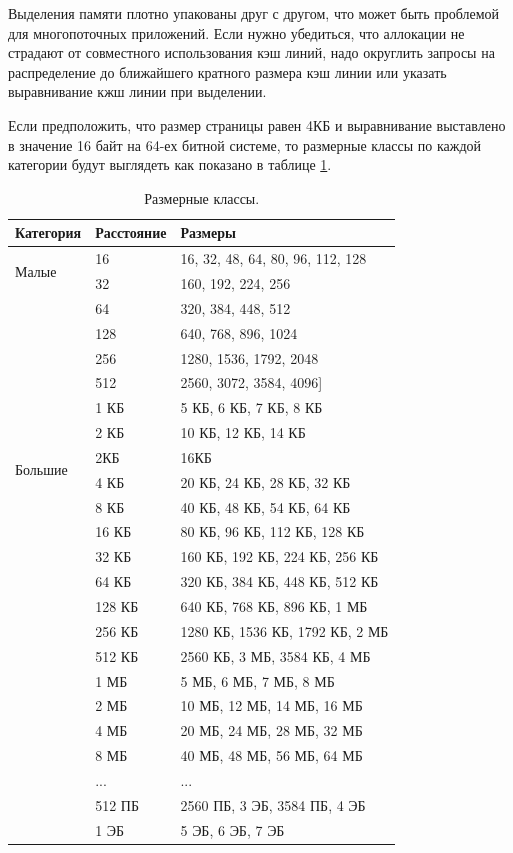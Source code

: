 Выделения памяти плотно упакованы друг с другом, что может быть проблемой для многопоточных приложений. Если нужно убедиться, что аллокации не страдают от совместного использования кэш линий, надо округлить запросы на распределение до ближайшего кратного размера кэш линии или указать выравнивание кжш линии при выделении.

Если предположить, что размер страницы равен 4КБ и выравнивание выставлено в значение 16 байт на 64-ех битной системе, то размерные классы по каждой категории будут выглядеть как показано в таблице \ref{jemalloc-size-classes}.

\begin{table}[h!]
	\begin{center}
		\begin{tabular}{l|l|l}
			\textbf{Категория} & \textbf{Расстояние} & \textbf{Размеры}\\
			\hline
			\multirow{2}{*}{Малые} & 16 & 16, 32, 48, 64, 80, 96, 112, 128\\
			& 32 & 160, 192, 224, 256\\
			& 64 & 320, 384, 448, 512\\
			& 128 & 640, 768, 896, 1024\\
			& 256 & 1280, 1536, 1792, 2048\\
			& 512 & 2560, 3072, 3584, 4096]\\
			& 1 КБ & 5 КБ, 6 КБ, 7 КБ, 8 КБ\\
			& 2 КБ & 10 КБ, 12 КБ, 14 КБ\\
			\hline
			\multirow{2}{*}{Большие} & 2КБ & 16КБ\\
			& 4 КБ &	20 КБ, 24 КБ, 28 КБ, 32 КБ\\
			& 8 КБ & 40 КБ, 48 КБ, 54 КБ, 64 КБ\\
			& 16 КБ & 80 КБ, 96 КБ, 112 КБ, 128 КБ\\
			& 32 КБ & 160 КБ, 192 КБ, 224 КБ, 256 КБ\\
			& 64 КБ & 320 КБ, 384 КБ, 448 КБ, 512 КБ\\
			& 128 КБ & 640 КБ, 768 КБ, 896 КБ, 1 МБ\\
			& 256 КБ & 1280 КБ, 1536 КБ, 1792 КБ, 2 МБ\\
			& 512 КБ & 2560 КБ, 3 МБ, 3584 КБ, 4 МБ\\
			& 1 МБ &	5 МБ, 6 МБ, 7 МБ, 8 МБ\\
			& 2 МБ &	10 МБ, 12 МБ, 14 МБ, 16 МБ\\
			& 4 МБ &	20 МБ, 24 МБ, 28 МБ, 32 МБ\\
			& 8 МБ &	40 МБ, 48 МБ, 56 МБ, 64 МБ\\
			&  ... & ...\\
			& 512 ПБ &	2560 ПБ, 3 ЭБ, 3584 ПБ, 4 ЭБ\\
			& 1 ЭБ	& 5 ЭБ, 6 ЭБ, 7 ЭБ\\
		\end{tabular}
		\caption{Размерные классы.}
		\label{jemalloc-size-classes}
	\end{center}
\end{table}

